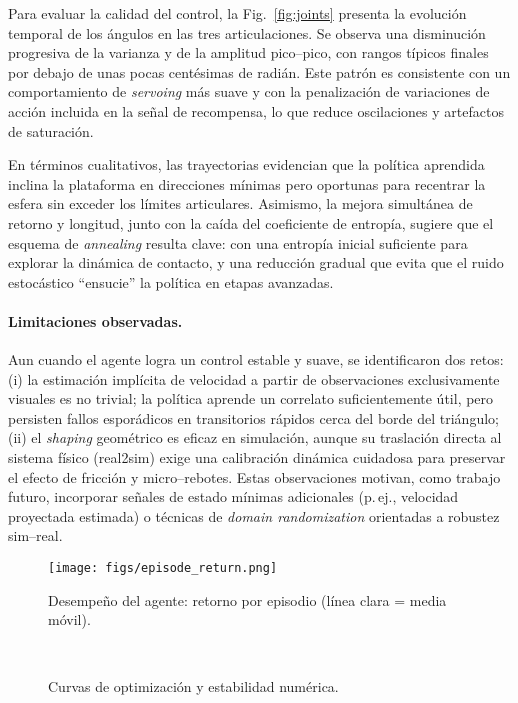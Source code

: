 \documentclass[conference]{IEEEtran}
\begin{document}
Para evaluar la calidad del control, la Fig.~\ref{fig:joints} presenta la evolución temporal de los ángulos en las tres articulaciones. Se observa una disminución progresiva de la varianza y de la amplitud pico–pico, con rangos típicos finales por debajo de unas pocas centésimas de radián. Este patrón es consistente con un comportamiento de \emph{servoing} más suave y con la penalización de variaciones de acción incluida en la señal de recompensa, lo que reduce oscilaciones y artefactos de saturación.

En términos cualitativos, las trayectorias evidencian que la política aprendida inclina la plataforma en direcciones mínimas pero oportunas para recentrar la esfera sin exceder los límites articulares. Asimismo, la mejora simultánea de retorno y longitud, junto con la caída del coeficiente de entropía, sugiere que el esquema de \emph{annealing} resulta clave: con una entropía inicial suficiente para explorar la dinámica de contacto, y una reducción gradual que evita que el ruido estocástico “ensucie” la política en etapas avanzadas.

\paragraph*{Limitaciones observadas.}
Aun cuando el agente logra un control estable y suave, se identificaron dos retos: (i) la estimación implícita de velocidad a partir de observaciones exclusivamente visuales es no trivial; la política aprende un correlato suficientemente útil, pero persisten fallos esporádicos en transitorios rápidos cerca del borde del triángulo; (ii) el \emph{shaping} geométrico es eficaz en simulación, aunque su traslación directa al sistema físico (real2sim) exige una calibración dinámica cuidadosa para preservar el efecto de fricción y micro–rebotes. Estas observaciones motivan, como trabajo futuro, incorporar señales de estado mínimas adicionales (p.\,ej., velocidad proyectada estimada) o técnicas de \emph{domain randomization} orientadas a robustez sim–real.


\begin{figure}[th]
  \centering
  \texttt{[image: figs/episode\_return.png]}
  \caption{Desempeño del agente: retorno por episodio (línea clara = media móvil).}
  \label{fig:ep-perf}
\end{figure}

\begin{figure}[th]
  \centering
  \hfill
  \\[3pt]
  \hfill
  \caption{Curvas de optimización y estabilidad numérica.}
  \label{fig:opt-stab}
\end{figure}
\end{document}
